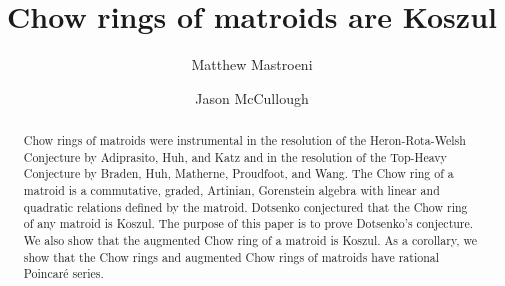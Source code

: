 \documentclass[11pt, reqno]{amsart}
\title[Chow rings of matroids]{Chow rings of matroids are Koszul}
\author[M. Mastroeni]{Matthew Mastroeni}
\author[J. McCullough]{Jason McCullough}
\theoremstyle{definition}
\numberwithin{equation}{section}
\numberwithin{table}{section}
\begin{document}



\begin{abstract}
Chow rings of matroids were instrumental in the resolution of the Heron-Rota-Welsh Conjecture by Adiprasito, Huh, and Katz and in the resolution of the Top-Heavy Conjecture by Braden, Huh, Matherne, Proudfoot, and Wang.   The Chow ring of a matroid is a commutative, graded, Artinian, Gorenstein algebra with linear and quadratic relations defined by the matroid.  Dotsenko conjectured that the Chow ring of any matroid is Koszul.  The purpose of this paper is to prove Dotsenko's conjecture.  We also show that the augmented Chow ring of a matroid is Koszul.  As a corollary, we show that the Chow rings and augmented Chow rings of matroids have rational Poincar\'{e} series.
\end{abstract}


\maketitle
\end{document}
